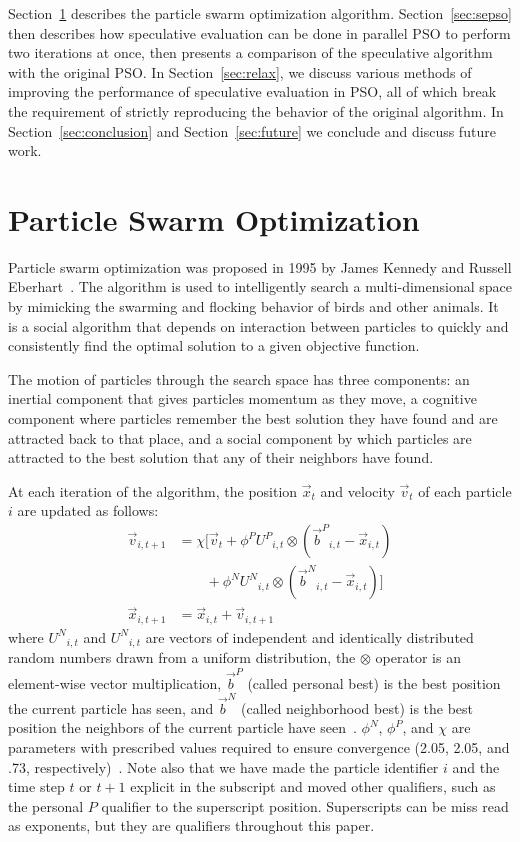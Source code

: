 \documentclass[journal,letterpaper]{IEEEtran}
\renewcommand{\sec}[1]{Section~\ref{sec:#1}}
\providecommand{\pers}{\ensuremath{P}}
\providecommand{\neigh}{\ensuremath{N}}
\providecommand{\nURand}{\ensuremath{U^\neigh}}
\providecommand{\pURand}{\ensuremath{U^\pers}}
\providecommand{\ppos}{\ensuremath{\Vec{x}}}
\providecommand{\pvel}{\ensuremath{\Vec{v}}}
\providecommand{\nbest}{\ensuremath{\Vec{b}^\neigh}}
\providecommand{\pbest}{\ensuremath{\Vec{b}^\pers}}
\providecommand{\constriction}{\ensuremath{\chi}}
\providecommand{\ncoeff}{\ensuremath{\phi^\neigh}}
\providecommand{\pcoeff}{\ensuremath{\phi^\pers}}
\begin{document}
\sec{pso} describes the particle swarm optimization algorithm.  \sec{sepso}
then describes how speculative evaluation can be done in parallel PSO to
perform two iterations at once, then presents a comparison of the speculative
algorithm with the original PSO.  In \sec{relax}, we discuss various methods of
improving the performance of speculative evaluation in PSO, all of which break
the requirement of strictly reproducing the behavior of the original algorithm.
In \sec{conclusion} and \sec{future} we conclude and discuss future work.

\section{Particle Swarm Optimization}
\label{sec:pso}

Particle swarm optimization was proposed in 1995 by James Kennedy and Russell
Eberhart~\cite{kennedy-icnn95}.  The algorithm is used to intelligently search
a multi-dimensional space by mimicking the swarming and flocking behavior of
birds and other animals. It is a social algorithm that depends on interaction
between particles to quickly and consistently find the optimal solution to a
given objective function.

The motion of particles through the search space has three components: an
inertial component that gives particles momentum as they move, a cognitive
component where particles remember the best solution they have found and are
attracted back to that place, and a social component by which particles are
attracted to the best solution that any of their neighbors have found.

At each iteration of the algorithm, the position $\ppos_t$ and velocity
$\pvel_t$ of each particle $i$ are updated as follows:
\begin{align}
\nonumber
	\pvel_{i,t+1} &=
		\constriction \bigl[ \pvel_t
			+ \pcoeff\pURand_{i,t}\otimes(\pbest_{i,t} - \ppos_{i,t}) \\
\label{eq:velupdate}
			& \quad \quad + \ncoeff\nURand_{i,t}\otimes(\nbest_{i,t} - \ppos_{i,t})
		\bigr] \\
\label{eq:posupdate}
	\ppos_{i,t+1} &= \ppos_{i,t} + \pvel_{i,t+1}
\end{align}
where \( \nURand_{i,t} \) and \( \nURand_{i,t} \) are vectors of independent
and identically distributed random numbers drawn from a uniform
distribution, the \( \otimes \) operator is an element-wise vector
multiplication, $\pbest$ (called personal best) is the best position the
current particle has seen, and $\nbest$ (called neighborhood best) is the best
position the neighbors of the current particle have seen~\cite{bratton-sis07}.  \( \ncoeff \), \(
\pcoeff \), and \( \constriction \) are parameters with prescribed values
required to ensure convergence (2.05, 2.05, and .73,
respectively)~\cite{clerc-tec02}. Note also that we have made the particle identifier $i$
and the time step $t$ or $t+1$ explicit in the subscript and moved other qualifiers,
such as the personal $\pers$ qualifier to the superscript position.
Superscripts can be miss read as exponents, but they are qualifiers throughout this paper.
\end{document}
